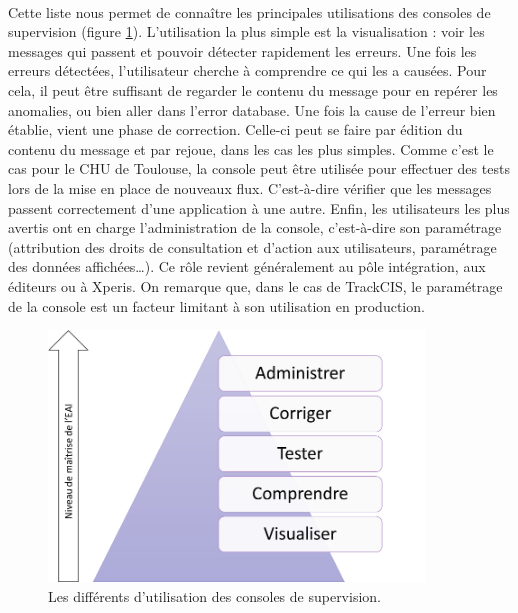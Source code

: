 			\paragraph{}
			Cette liste nous permet de connaître les principales utilisations des
			consoles de supervision (figure \ref{usage_consoles}). L’utilisation la plus
			simple est la visualisation : voir les messages qui passent et pouvoir détecter rapidement
			les erreurs. Une fois les erreurs détectées, l’utilisateur cherche à
			comprendre ce qui les a causées. Pour cela, il peut être suffisant de
			regarder le contenu du message pour en repérer les anomalies, ou bien aller
			dans l’error database. Une fois la cause de l’erreur bien établie, vient une
			phase de correction. Celle-ci peut se faire par édition du contenu du
			message et par rejoue, dans les cas les plus simples. Comme c’est le cas
			pour le CHU de Toulouse, la console peut être utilisée pour effectuer des
			tests lors de la mise en place de nouveaux flux. C’est-à-dire vérifier que
			les messages passent correctement d’une application à une autre. Enfin, les
			utilisateurs les plus avertis ont en charge l’administration de la console,
			c’est-à-dire son paramétrage (attribution des droits de consultation et
			d’action aux utilisateurs, paramétrage des données affichées\ldots). Ce rôle
			revient généralement au pôle intégration, aux éditeurs ou à Xperis. On
			remarque que, dans le cas de TrackCIS, le paramétrage de la console est un
			facteur limitant à son utilisation en production.
			\begin{figure}[H]%
				\centering
				\includegraphics[width=10cm]{../img/usage_1.png}
				\caption{\label{usage_consoles} Les différents d'utilisation des consoles de
				supervision.}
			\end{figure}
			
